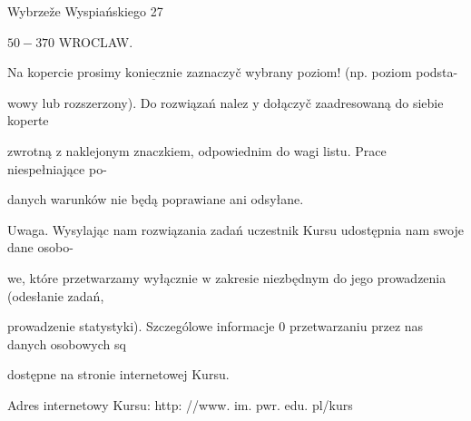 \documentclass[a4paper,12pt]{article}
\begin{document}
Wybrzeže Wyspiańskiego 27

$50-370$ WROCLAW.

Na kopercie prosimy $\underline{\mathrm{k}\mathrm{o}\mathrm{n}\mathrm{i}\mathrm{e}\mathrm{c}\mathrm{z}\mathrm{n}\mathrm{i}\mathrm{e}}$ zaznaczyč wybrany poziom! (np. poziom podsta-

wowy lub rozszerzony). Do rozwiązań nalez $\mathrm{y}$ dołączyč zaadresowaną do siebie koperte

zwrotną $\mathrm{z}$ naklejonym znaczkiem, odpowiednim do wagi listu. Prace niespełniające po-

danych warunków nie będą poprawiane ani odsyłane.

Uwaga. Wysylając nam rozwiązania zadań uczestnik Kursu udostępnia nam swoje dane osobo-

we, które przetwarzamy wyłącznie $\mathrm{w}$ zakresie niezbędnym do jego prowadzenia (odesłanie zadań,

prowadzenie statystyki). Szczególowe informacje $0$ przetwarzaniu przez nas danych osobowych sq

dostępne na stronie internetowej Kursu.

Adres internetowy Kursu: http: //www. im. pwr. edu. pl/kurs
\end{document}
